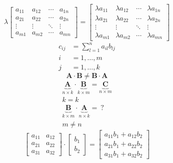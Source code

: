 \documentclass[../SOP.tex]{subfile}
\begin{document}
\begin{equation*}
  \lambda
  \begin{bmatrix}
    a_{11} & a_{12} & \cdots & a_{1n} \\
    a_{21} & a_{22} & \cdots & a_{2n} \\
    \vdots & \vdots & \ddots & \vdots \\
    a_{m1} & a_{m2} & \cdots & a_{mn}
  \end{bmatrix}
  =
  \begin{bmatrix}
    \lambda a_{11} & \lambda a_{12} & \cdots & \lambda a_{1n} \\
    \lambda a_{21} & \lambda a_{22} & \cdots & \lambda a_{2n} \\
    \vdots & \vdots & \ddots & \vdots \\
    \lambda a_{m1} & \lambda a_{m2} & \cdots & \lambda a_{mn}
  \end{bmatrix}
\end{equation*}
\begin{align*}
  c_{ij} &= \sum_{l=1}^n a_{il}b_{lj}\\
  i&=1,\dots,m\\
  j&=1,\dots,k
\end{align*}
\begin{equation*}
  \mathbf{A}\cdot\mathbf{B}\neq\mathbf{B}\cdot\mathbf{A}
\end{equation*}
\begin{gather*}
  \underbrace{\mathbf{A}}_{n\times k}\cdot\underbrace{\mathbf{B}}_{k\times m}=\underbrace{\mathbf{C}}_{n\times m}\\
  k=k\\
  \underbrace{\mathbf{B}}_{k\times m}\cdot\underbrace{\mathbf{A}}_{n\times k}=\ ?\\
  m\neq n
\end{gather*}
\begin{equation*}
  \begin{bmatrix}
    a_{11} & a_{12} \\
    a_{21} & a_{22} \\
    a_{31} & a_{32}
  \end{bmatrix}
  \cdot
  \begin{bmatrix}
    b_1 \\ b_2
  \end{bmatrix}
  =
  \begin{bmatrix}
    a_{11}b_1 + a_{12}b_2\\
    a_{21}b_1 + a_{22}b_2 \\
    a_{31}b_1 + a_{32}b_2
  \end{bmatrix}
\end{equation*}
\end{document}
